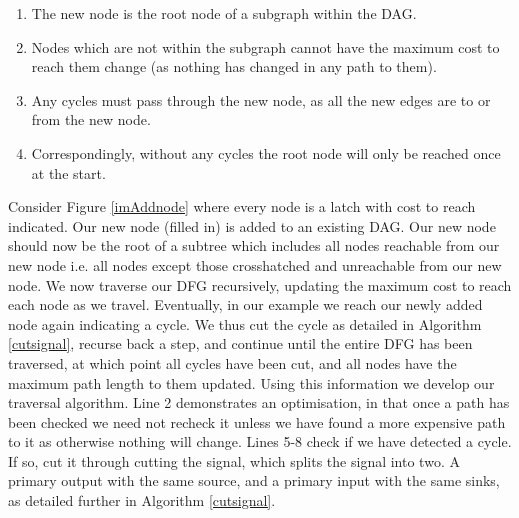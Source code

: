 \documentclass[12pt,final,oneside]{dwThesis} %
\begin{document}
   \begin{enumerate}

      \item The new node is the root node of a subgraph within the \gls{DAG}.
      \item Nodes which are not within the subgraph cannot have the maximum
         cost to reach them change (as nothing has changed in any path to
         them).
      \item Any cycles must pass through the new node, as all the new edges are
         to or from the new node.
      \item Correspondingly, without any cycles the root node will only be
         reached once at the start.  
   \end{enumerate}
   Consider Figure
   \ref{imAddnode} where every node is a latch with cost to reach indicated.
   Our new node (filled in) is added to an existing \gls{DAG}. Our new node
   should now be the root of a subtree which includes all nodes reachable
   from our new node i.e. all nodes except those crosshatched and
   unreachable from our new node.  We now traverse our \gls{DFG}
   recursively, updating the maximum cost to reach each node as we travel.
   Eventually, in our example we reach our newly added node again indicating
   a cycle. We thus cut the cycle as detailed in Algorithm
   \ref{cutsignal}, recurse back a step,
   and continue until the entire \gls{DFG} has been traversed, at which
   point all cycles have been cut, and all nodes have the maximum path
   length to them updated.  Using this information we develop our traversal
   algorithm.  Line 2 demonstrates an optimisation, in that once a path has
   been checked we need not recheck it unless we have found a more expensive
   path to it as otherwise nothing will change.  Lines 5-8 check if we have
   detected a cycle. If so, cut it through cutting the signal, which splits
   the signal into two. A primary output with the same source, and a primary
   input with the same sinks, as detailed further in Algorithm
   \ref{cutsignal}.
\end{document}
